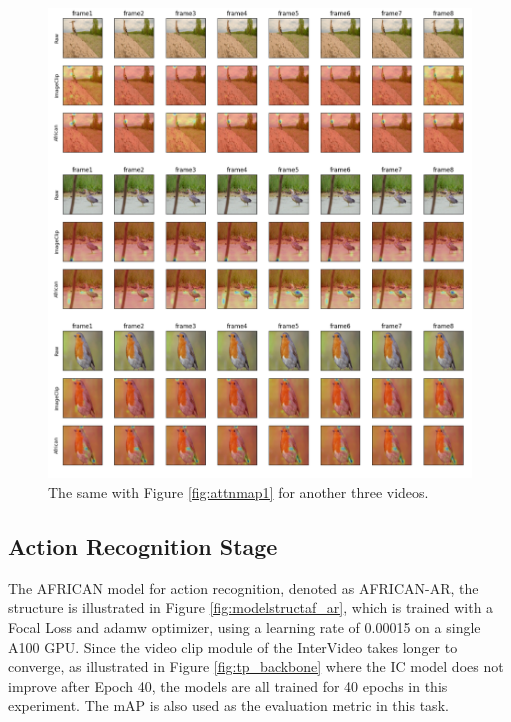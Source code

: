 \begin{figure}[ht]
    \centering
    \includegraphics[width=1.0\textwidth]{assets/charts/5_4_AttentionMaps_2}
    \caption[Attention Map 1]{The same with Figure \ref{fig:attnmap1} for another three videos.}
    \label{fig:attnmap2}
\end{figure}







\subsection{Action Recognition Stage}
The AFRICAN model for action recognition, denoted as AFRICAN-AR, the structure is illustrated in Figure \ref{fig:modelstructaf_ar}, which is trained with a Focal Loss and adamw optimizer, using a learning rate of 0.00015 on a single A100 GPU. Since the video clip module of the InterVideo takes longer to converge, as illustrated in Figure \ref{fig:tp_backbone} where the IC model does not improve after Epoch 40, the models are all trained for 40 epochs in this experiment. The mAP is also used as the evaluation metric in this task.

